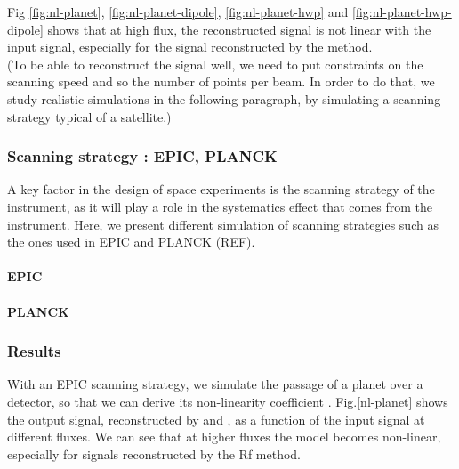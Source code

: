 Fig \ref{fig:nl-planet}, \ref{fig:nl-planet-dipole}, \ref{fig:nl-planet-hwp} and \ref{fig:nl-planet-hwp-dipole} shows that at high flux, the reconstructed signal is not linear with the input signal, especially for the signal reconstructed by the \rf method.\\

(To be able to reconstruct the signal well, we need to put constraints on the scanning speed and so the number of points per beam. In order to do that, we study realistic simulations in the following paragraph, by simulating a scanning strategy typical of a satellite.) 

\newpage

\subsubsection{Scanning strategy : EPIC, PLANCK}
A key factor in the design of space experiments is the scanning strategy of the instrument, as it will play a role in the systematics effect that comes from the instrument. Here, we present different simulation of scanning strategies such as the ones used in EPIC and PLANCK (REF).

\paragraph{EPIC}
\paragraph{PLANCK}

\subsubsection{Results}
With an EPIC scanning strategy, we simulate the passage of a planet over a detector, so that we can derive its non-linearity coefficient \eps. Fig.\ref{nl-planet} shows the output signal, reconstructed by \rf and \cf, as a function of the input signal at different fluxes. We can see that at higher fluxes the model becomes non-linear, especially for signals reconstructed by the Rf method. 

%


